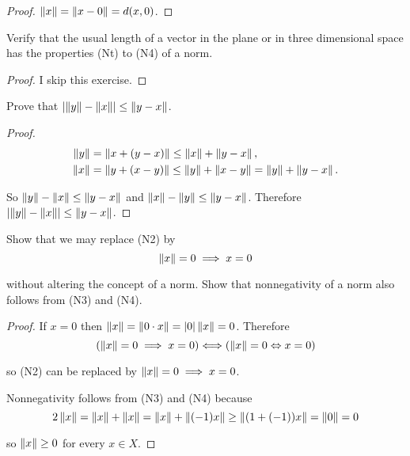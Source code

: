\begin{proof}
    $\left\Vert{x}\right\Vert = \left\Vert{x - 0}\right\Vert = d(x, 0)$.
\end{proof}

\begin{exercise}\label{chapter2:section2:exercise2}
    Verify that the usual length of a vector in the plane or in three dimensional space has the properties (Nt) to (N4) of a norm.
\end{exercise}

\begin{proof}
    I skip this exercise.
\end{proof}

\begin{exercise}\label{chapter2:section2:exercise3}
    Prove that $\left\vert{\left\Vert{y}\right\Vert - \left\Vert{x}\right\Vert}\right\vert \leq \left\Vert{y - x}\right\Vert$.
\end{exercise}

\begin{proof}
    \begin{align*}
        \left\Vert{y}\right\Vert & = \left\Vert{x + (y - x)}\right\Vert\leq \left\Vert{x}\right\Vert + \left\Vert{y - x}\right\Vert,                            \\
        \left\Vert{x}\right\Vert & = \left\Vert{y + (x - y)}\right\Vert \leq \left\Vert{y}\right\Vert + \left\Vert{x - y}\right\Vert = \left\Vert{y}\right\Vert + \left\Vert{y - x}\right\Vert.
    \end{align*}

    So $\left\Vert{y}\right\Vert - \left\Vert{x}\right\Vert\leq \left\Vert{y - x}\right\Vert$ and $\left\Vert{x}\right\Vert - \left\Vert{y}\right\Vert\leq \left\Vert{y - x}\right\Vert$. Therefore $\left\vert{\left\Vert{y}\right\Vert - \left\Vert{x}\right\Vert}\right\vert \leq \left\Vert{y - x}\right\Vert$.
\end{proof}

\begin{exercise}\label{chapter2:section2:exercise4}
    Show that we may replace (N2) by
    \[
        \left\Vert{x}\right\Vert = 0 \implies x = 0
    \]

    without altering the concept of a norm. Show that nonnegativity of a norm also follows from (N3) and (N4).
\end{exercise}

\begin{proof}
    If $x = 0$ then $\left\Vert{x}\right\Vert = \left\Vert{0\cdot x}\right\Vert = \left\vert{0}\right\vert\left\Vert{x}\right\Vert = 0$. Therefore
    \[
        \left(\left\Vert{x}\right\Vert = 0 \implies x = 0\right) \Longleftrightarrow \left(\left\Vert{x}\right\Vert = 0 \Leftrightarrow x = 0\right)
    \]

    so (N2) can be replaced by $\left\Vert{x}\right\Vert = 0 \implies x = 0$.

    Nonnegativity follows from (N3) and (N4) because
    \[
        2\left\Vert{x}\right\Vert = \left\Vert{x}\right\Vert + \left\Vert{x}\right\Vert = \left\Vert{x}\right\Vert + \left\Vert{(-1)x}\right\Vert \geq \left\Vert{(1 + (-1))x}\right\Vert = \left\Vert{0}\right\Vert = 0
    \]

    so $\left\Vert{x}\right\Vert\geq 0$ for every $x\in X$.
\end{proof}

